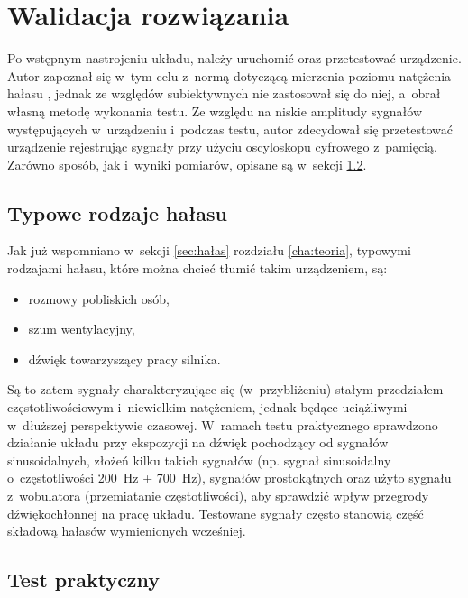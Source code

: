 \chapter{Walidacja rozwiązania}
\label{cha:tests}
Po wstępnym nastrojeniu układu, należy uruchomić oraz przetestować urządzenie. Autor zapoznał się w~tym celu z~normą dotyczącą mierzenia poziomu natężenia hałasu \cite{test_norm}, jednak ze względów subiektywnych nie zastosował się do niej, a~obrał własną metodę wykonania testu. Ze względu na niskie amplitudy sygnałów występujących w~urządzeniu i~podczas testu, autor zdecydował się przetestować urządzenie rejestrując sygnały przy użyciu oscyloskopu cyfrowego z~pamięcią. Zarówno sposób, jak i~wyniki pomiarów, opisane są w~sekcji \ref{sec:practical_test}.
\section{Typowe rodzaje hałasu}
Jak już wspomniano w~sekcji \ref{sec:hałas} rozdziału \ref{cha:teoria}, typowymi rodzajami hałasu, które można chcieć tłumić takim urządzeniem, są:
\begin{itemize}
	\item rozmowy pobliskich osób,
	\item szum wentylacyjny,
	\item dźwięk towarzyszący pracy silnika.
\end{itemize}
Są to zatem sygnały charakteryzujące się (w~przybliżeniu) stałym przedziałem częstotliwościowym i~niewielkim natężeniem, jednak będące uciążliwymi w~dłuższej perspektywie czasowej. W~ramach testu praktycznego sprawdzono działanie układu przy ekspozycji na dźwięk pochodzący od sygnałów sinusoidalnych, złożeń kilku takich sygnałów (np. sygnał sinusoidalny o~częstotliwości \SI{200}{\Hz} + \SI{700}{\Hz}), sygnałów prostokątnych oraz użyto sygnału z~wobulatora (przemiatanie częstotliwości), aby sprawdzić wpływ przegrody dźwiękochłonnej na pracę układu. Testowane sygnały często stanowią część składową hałasów wymienionych wcześniej.
\section{Test praktyczny}
\label{sec:practical_test}
